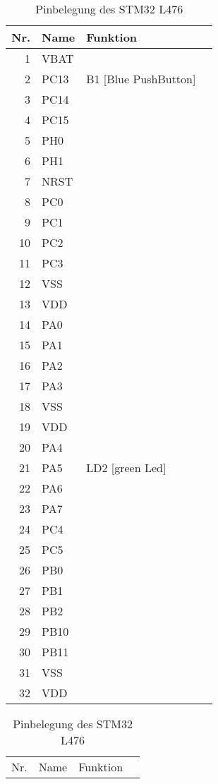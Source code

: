 \documentclass[12pt,fleqn,parskip=half,twoside,toc=index,headings=small,a4paper]{scrreprt}
\begin{document}
\begin{table}[H]
	\caption{Pinbelegung des STM32 L476}
	\renewcommand{\arraystretch}{1.0}
	\centering
	\begin{minipage}{.48\linewidth}
		\begin{tabularx}{\linewidth}{@{}rllX@{}}
			\toprule
			Nr. & Name & Funktion \\
			\midrule
			1 	& VBAT\\
			2 	& PC13 & B1 [Blue PushButton]\\
			3 	& PC14 \\
			4 	& PC15 \\
			5 	& PH0 \\
			6 	& PH1 \\
			7 	& NRST & \\
			8 	& PC0 & \\
			9 	& PC1 & \\ 
			10	& PC2 & \\
			11	& PC3 & \\
			12  & VSS & \\
			13  & VDD & \\
			14  & PA0 & \\
			15  & PA1 & \\
			16  & PA2 & \\ 
			\midrule
			17  & PA3  & \\
			18  & VSS \\ 
			19  & VDD & \\ 
			20  & PA4 & \\ 
			21  & PA5 & LD2 [green Led] \\ 
			22  & PA6 \\ 
			23  & PA7 & \\
			24  & PC4 & \\ 
			25  & PC5 & \\ 
			26  & PB0  & \\ 
			27  & PB1 \\ 
			28  & PB2\\ 
			29  & PB10 & \\
			30  & PB11 & \\
			31  & VSS & \\
			32  & VDD & \\			
			\bottomrule
		\end{tabularx}
	\end{minipage}%
	\hfill
	\begin{minipage}{.48\linewidth}
		\begin{tabularx}{\linewidth}{@{}rllX@{}}
			\toprule
			Nr. & Name & Funktion \\

\end{tabularx}
\end{minipage}
\end{table}
\end{document}

